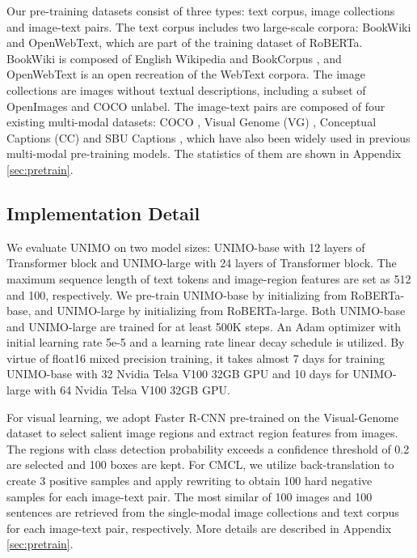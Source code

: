 \documentclass[11pt,a4paper]{article}
\begin{document}
Our pre-training datasets consist of three types: text corpus, image collections and image-text pairs. 
The text corpus includes two large-scale corpora: BookWiki and OpenWebText, which are part of the training dataset of RoBERTa. BookWiki is composed of English Wikipedia and BookCorpus \citep{zhu2015aligning}, and OpenWebText is an open recreation of the WebText corpora.
The image collections are images without textual descriptions, including a subset of OpenImages \citep{krasin2017openimages} and COCO unlabel.
The image-text pairs are composed of four existing multi-modal datasets: COCO \citep{lin2014microsoft}, Visual Genome (VG) \citep{krishna2017visual}, Conceptual Captions (CC) \citep{sharma-etal-2018-conceptual} and SBU Captions \citep{ordonez2011im2text}, which have also been widely used in previous multi-modal pre-training models.
The statistics of them are shown in Appendix \ref{sec:pretrain}.




\subsection{Implementation Detail}
\label{ssec:imp}
We evaluate UNIMO on two model sizes: UNIMO-base with 12 layers of Transformer block and UNIMO-large with 24 layers of Transformer block. 
The maximum sequence length of text tokens and image-region features are set as 512 and 100, respectively. 
We pre-train UNIMO-base by initializing from RoBERTa-base, and UNIMO-large by initializing from RoBERTa-large. 
Both UNIMO-base and UNIMO-large are trained for at least 500K steps.
An Adam optimizer with initial learning rate 5e-5 and a learning rate linear decay schedule is utilized.
By virtue of float16 mixed precision training, it takes almost 7 days for training UNIMO-base with 32 Nvidia Telsa V100 32GB GPU and 10 days for UNIMO-large with 64 Nvidia Telsa V100 32GB GPU.


For visual learning, we adopt Faster R-CNN \citep{ren2016faster} pre-trained on the Visual-Genome dataset to select salient image regions and extract region features from images.
The regions with class detection probability exceeds a confidence threshold of 0.2 are selected and 100 boxes are kept.
For CMCL, we utilize back-translation to create 3 positive samples and apply rewriting to obtain 100 hard negative samples for each image-text pair.
The most similar of 100 images and 100 sentences are retrieved from the single-modal image collections and text corpus for each image-text pair, respectively.
More details are described in Appendix \ref{sec:pretrain}.
\end{document}
